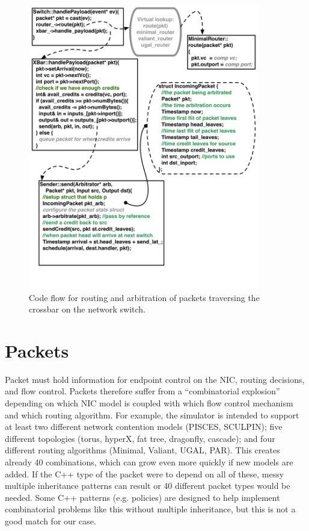 \begin{figure}
\includegraphics[width=0.9\textwidth]{figures/RoutingFlow.png}
\caption{Code flow for routing and arbitration of packets traversing the crossbar on the network switch.}
\label{fig:xbarFlow}
\end{figure}

\section{Packets}
\label{sec:packets}

Packet must hold information for endpoint control on the NIC, routing decisions, and flow control. 
Packets therefore suffer from a ``combinatorial explosion'' depending on which NIC model is coupled with which flow control mechanism and which routing algorithm.
For example, the simulator is intended to support at least two different network contention models (PISCES, SCULPIN);
five different topologies (torus, hyperX, fat tree, dragonfly, cascade); and four different routing algorithms (Minimal, Valiant, UGAL, PAR).
This creates already 40 combinations, which can grow even more quickly if new models are added.
If the C++ type of the packet were to depend on all of these, messy multiple inheritance patterns can result or 40 different packet types would be needed.
Some C++ patterns (e.g. policies) are designed to help implement combinatorial problems like this without multiple inheritance,
but this is not a good match for our case.


